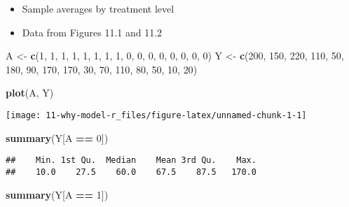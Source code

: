 \documentclass[
  10pt,
]{book}
\newenvironment{Shaded}{\begin{snugshade}}{\end{snugshade}}
\newcommand{\DecValTok}[1]{\textcolor[rgb]{0.00,0.00,0.81}{#1}}
\newcommand{\KeywordTok}[1]{\textcolor[rgb]{0.13,0.29,0.53}{\textbf{#1}}}
\newcommand{\NormalTok}[1]{#1}
\newcommand{\OperatorTok}[1]{\textcolor[rgb]{0.81,0.36,0.00}{\textbf{#1}}}
\newcommand{\StringTok}[1]{\textcolor[rgb]{0.31,0.60,0.02}{#1}}
\providecommand{\tightlist}{%
  \setlength{\itemsep}{0pt}\setlength{\parskip}{0pt}}
\begin{document}
\begin{itemize}
\tightlist
\item
  Sample averages by treatment level
\item
  Data from Figures 11.1 and 11.2
\end{itemize}

\begin{Shaded}
\begin{Highlighting}[]
\NormalTok{A <-}\StringTok{ }\KeywordTok{c}\NormalTok{(}\DecValTok{1}\NormalTok{, }\DecValTok{1}\NormalTok{, }\DecValTok{1}\NormalTok{, }\DecValTok{1}\NormalTok{, }\DecValTok{1}\NormalTok{, }\DecValTok{1}\NormalTok{, }\DecValTok{1}\NormalTok{, }\DecValTok{1}\NormalTok{, }\DecValTok{0}\NormalTok{, }\DecValTok{0}\NormalTok{, }\DecValTok{0}\NormalTok{, }\DecValTok{0}\NormalTok{, }\DecValTok{0}\NormalTok{, }\DecValTok{0}\NormalTok{, }\DecValTok{0}\NormalTok{, }\DecValTok{0}\NormalTok{)}
\NormalTok{Y <-}\StringTok{ }\KeywordTok{c}\NormalTok{(}\DecValTok{200}\NormalTok{, }\DecValTok{150}\NormalTok{, }\DecValTok{220}\NormalTok{, }\DecValTok{110}\NormalTok{, }\DecValTok{50}\NormalTok{, }\DecValTok{180}\NormalTok{, }\DecValTok{90}\NormalTok{, }\DecValTok{170}\NormalTok{, }\DecValTok{170}\NormalTok{, }\DecValTok{30}\NormalTok{,}
       \DecValTok{70}\NormalTok{, }\DecValTok{110}\NormalTok{, }\DecValTok{80}\NormalTok{, }\DecValTok{50}\NormalTok{, }\DecValTok{10}\NormalTok{, }\DecValTok{20}\NormalTok{)}

\KeywordTok{plot}\NormalTok{(A, Y)}
\end{Highlighting}
\end{Shaded}

\begin{center}\texttt{[image: 11-why-model-r\_files/figure-latex/unnamed-chunk-1-1]} \end{center}

\begin{Shaded}
\begin{Highlighting}[]
\KeywordTok{summary}\NormalTok{(Y[A }\OperatorTok{==}\StringTok{ }\DecValTok{0}\NormalTok{])}
\end{Highlighting}
\end{Shaded}

\begin{verbatim}
##    Min. 1st Qu.  Median    Mean 3rd Qu.    Max. 
##    10.0    27.5    60.0    67.5    87.5   170.0
\end{verbatim}

\begin{Shaded}
\begin{Highlighting}[]
\KeywordTok{summary}\NormalTok{(Y[A }\OperatorTok{==}\StringTok{ }\DecValTok{1}\NormalTok{])}
\end{Highlighting}
\end{Shaded}
\end{document}
